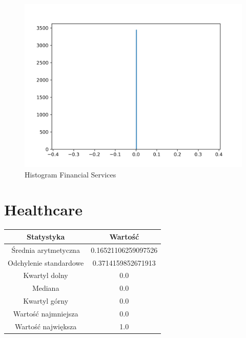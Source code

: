 \documentclass{article}
\begin{document}
\begin{figure}[h!]
    \includegraphics[width=\linewidth]{variables/Financial Services.png}
    \caption{Histogram Financial Services }
\end{figure}\section{ Healthcare }

\begin{center}
    \begin{tabular}{|c | c|} 
    \hline
    Statystyka & Wartość \\
    \hline\hline
    Średnia arytmetyczna & 0.16521106259097526 \\ 
    \hline
    Odchylenie standardowe & 0.3714159852671913 \\
    \hline
    Kwartyl dolny & 0.0 \\
    \hline
    Mediana & 0.0 \\
    \hline
    Kwartyl górny & 0.0 \\
    \hline
    Wartość najmniejsza & 0.0 \\
    \hline
    Wartość największa & 1.0 \\
    \hline
   \end{tabular}
\end{center}
\end{document}
